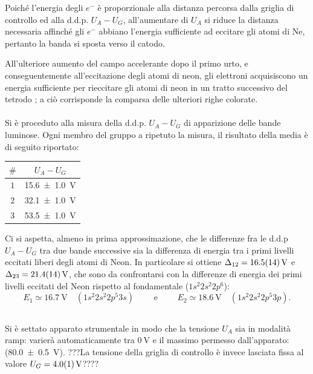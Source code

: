		Poiché l'energia degli $e^{-}$ è proporzionale alla distanza 
		percorsa dalla griglia di controllo ed alla d.d.p. $U_A-U_G$,
		all'aumentare di $U_A$ si riduce
		la distanza necessaria affinché gli $e^-$ abbiano l'energia sufficiente 
		ad eccitare gli atomi di Ne, pertanto la banda si sposta verso il catodo.
		
		All'ulteriore aumento del campo accelerante dopo il
		primo urto, e conseguentemente all'eccitazione degli 
		atomi di neon, gli elettroni acquisiscono un energia
		sufficiente per rieccitare gli atomi 
		di neon in un tratto successivo del tetrodo ;
		a ciò corrisponde la comparsa delle ulteriori righe colorate. 
\paragraph{}	
	Si è proceduto alla misura della d.d.p. $U_A-U_G$ di apparizione delle bande luminose. Ogni membro del gruppo a ripetuto la misura, il risultato della media è di seguito riportato:
	
	\begin{table}[H]
 		\centering
		\begin{tabular}{cc}
 			\toprule
 			$\#$  &  $U_A- U_G$\\
  			\midrule
  			$1$ & \SI{15.6 \pm 1.0}{\volt}\\
  			$2$ &  \SI{32.1 \pm 1.0}{\volt}\\
  			$3$ & \SI{53.5 \pm 1.0}{\volt}\\
  			\bottomrule
 		\end{tabular}
	\label{tab:a}
	\end{table}
	

	
	Ci si aspetta, almeno in prima approssimazione, che le differenze fra le d.d.p $U_A-U_G$ tra due bande successive sia la differenza di energia tra i primi livelli eccitati liberi degli atomi di Neon.
	In particolare si ottiene $\Delta_{12} = \SI{16.5 \pm 1.4}{\volt}$ e $\Delta_{23} = \SI{21.4 \pm 1.4}{\volt}$, che sono da confrontarsi con la differenze di energia dei primi livelli eccitati del Neon rispetto al fondamentale ($1s^2 2s^2 2p^6$): 
	$$E_1 \simeq \SI{16.7}{\volt} \quad (1s^2 2s^2 2p^5 3s) \qquad \text{ e } \qquad E_2 \simeq \SI{18.6}{\volt} \quad (1s^2 2s^2 2p^5 3p).$$

\subsection{}	
	Si è settato apparato strumentale in modo che
	la tensione $U_A$ sia in modalità ramp: varierà automaticamente tra $\SI{0}{\volt}$ e il massimo permesso dall'apparato:
	(\SI{80.0 \pm 0.5}{\volt}). ???La tensione della griglia di controllo è invece lasciata fissa al valore $U_G = \SI{4.0 \pm 0.1}{\volt}$????
	
